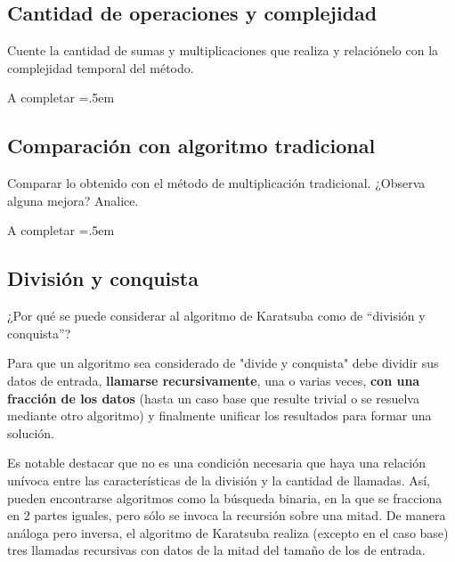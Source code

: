 \documentclass[titlepage,a4paper]{article}
\newenvironment{lcverbatim}
 {\SaveVerbatim{cverb}}
 {\endSaveVerbatim
  \flushleft\fboxrule=0pt\fboxsep=.5em
  \colorbox{cverbbg}{%
    \makebox[\dimexpr\linewidth-2\fboxsep][l]{\BUseVerbatim{cverb}}%
  }
  \endflushleft
}
\begin{document}
\subsection{Cantidad de operaciones y complejidad}

\begin{tcolorbox}[colback=blue!5!white,colframe=blue!75!black,title=Enunciado 1.2]
    Cuente la cantidad de sumas y multiplicaciones que realiza y relaciónelo con la complejidad temporal del método.
\end{tcolorbox}

\begin{lcverbatim}
    A completar
\end{lcverbatim}


\subsection{Comparación con algoritmo tradicional}
\begin{tcolorbox}[colback=blue!5!white,colframe=blue!75!black,title=Enunciado 1.3]
    Comparar lo obtenido con el método de multiplicación tradicional. ¿Observa alguna mejora? Analice.
\end{tcolorbox}

\begin{lcverbatim}
    A completar
\end{lcverbatim}


\subsection{División y conquista}

\begin{tcolorbox}[colback=blue!5!white,colframe=blue!75!black,title=Enunciado 1.4]
    ¿Por qué se puede considerar al algoritmo de Karatsuba como de “división y conquista”?
\end{tcolorbox}

Para que un algoritmo sea considerado de "divide y conquista" debe dividir sus datos de entrada, \textbf{llamarse recursivamente}, una o varias veces, \textbf{con una fracción de los datos} (hasta un caso base que resulte trivial o se resuelva mediante otro algoritmo) y finalmente unificar los resultados para formar una solución.

Es notable destacar que no es una condición necesaria que haya una relación unívoca entre las características de la división y la cantidad de llamadas. Así, pueden encontrarse algoritmos como la búsqueda binaria, en la que se fracciona en 2 partes iguales, pero sólo se invoca la recursión sobre una mitad. De manera análoga pero inversa, el algoritmo de Karatsuba realiza (excepto en el caso base) tres llamadas recursivas con datos de la mitad del tamaño de los de entrada.
\end{document}
